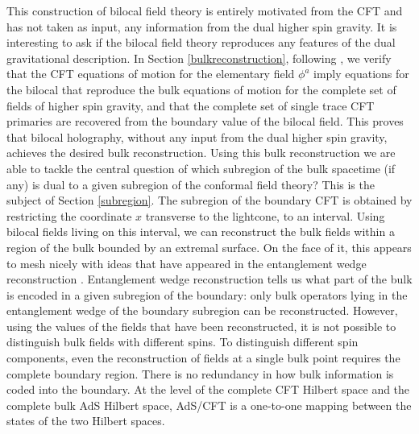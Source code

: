 \documentclass[a4paper,12pt]{article}
\begin{document}
This construction of bilocal field theory is entirely motivated from the CFT and has not taken as input, any information
from the dual higher spin gravity.
It is interesting to ask if the bilocal field theory reproduces any features of the dual gravitational description.
In Section \ref{bulkreconstruction}, following \cite{Koch:2010cy,Koch:2014aqa}, we verify that the CFT equations of motion 
for the elementary field $\phi^a$ imply equations for the bilocal that reproduce the bulk equations of motion for the complete 
set of fields of higher spin gravity, and that the complete set of single trace CFT primaries are recovered from the boundary 
value of the bilocal field. 
This proves that bilocal holography, without any input from the dual higher spin gravity, achieves the desired bulk 
reconstruction.
Using this bulk reconstruction we are able to tackle the central question of which subregion of the bulk spacetime (if any) 
is dual to a given subregion of the conformal field theory? 
This is the subject of Section \ref{subregion}.
The subregion of the boundary CFT is obtained by restricting the coordinate $x$ transverse to the lightcone, to an interval.
Using bilocal fields living on this interval, we can reconstruct the bulk fields within a region of the bulk bounded by an 
extremal surface.
On the face of it, this appears to mesh nicely with ideas that have appeared in the entanglement wedge 
reconstruction \cite{Jafferis:2015del,Dong:2016eik,Cotler:2017erl,Chen:2019gbt}.
Entanglement wedge reconstruction tells us what part of the bulk is encoded in a given subregion of the boundary: only
bulk operators lying in the entanglement wedge of the boundary subregion can be reconstructed.
However, using the values of the fields that have been reconstructed, it is not possible to distinguish bulk fields with 
different spins.
To distinguish different spin components, even the reconstruction of fields at a single bulk point requires the complete 
boundary region.
There is no redundancy in how bulk information is coded into the boundary.
At the level of the complete CFT Hilbert space and the complete bulk AdS Hilbert space, AdS/CFT is a one-to-one
mapping between the states of the two Hilbert spaces.
\end{document}
